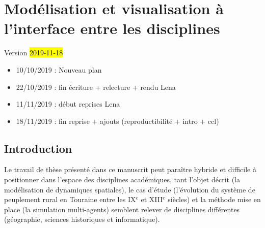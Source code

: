 %

\chapter{Modélisation et visualisation à l'interface entre les disciplines}
\label{chap:chap1}
\begin{center}
	{\large Version \hl{2019-11-18}}
\end{center}

\begin{itemize}
	\item 10/10/2019 : Nouveau plan
	\item 22/10/2019 : fin écriture + relecture + rendu Lena
	\item 11/11/2019 : début reprises Lena
	\item 18/11/2019 : fin reprise + ajouts (reproductibilité + intro + ccl)
\end{itemize} 

\minitoc

\clearpage
\section*{Introduction}

Le travail de thèse présenté dans ce manuscrit peut paraître hybride et difficile à positionner dans l'espace des disciplines académiques, tant l'objet décrit (la modélisation de dynamiques spatiales), le cas d'étude (l'évolution du système de peuplement rural en Touraine entre les IX$^e$ et XIII$^e$ siècles) et la méthode mise en place (la simulation multi-agents) semblent relever de disciplines différentes (géographie, sciences historiques et informatique).

